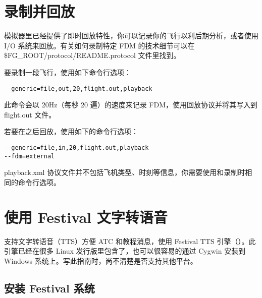 \section{录制并回放}

模拟器里已经提供了即时回放特性，你可以记录你的飞行以利后期分析，或者使用 I/O 系统来回放。有关如何录制特定 FDM 的技术细节可以在 \$FG\_ROOT/protocol/README.protocol 文件里找到。

要录制一段飞行，使用如下命令行选项：

\begin{verbatim}
--generic=file,out,20,flight.out,playback
\end{verbatim}

此命令会以 20Hz（每秒 20 遍）的速度来记录 FDM，使用回放协议并将其写入到 flight.out 文件。

若要在之后回放，使用如下的命令行选项：

\begin{verbatim}
--generic=file,in,20,flight.out,playback
--fdm=external
\end{verbatim}

playback.xml 协议文件并不包括飞机类型、时刻等信息，你需要使用和录制时相同的命令行选项。

\section{使用 Festival 文字转语音}

\FlightGear{} 支持文字转语音（TTS）方便 ATC 和教程消息，使用 Festival TTS 引擎（）。此引擎已经在很多 Linux 发行版里包含了，也可以很容易的通过 Cygwin 安装到 Windows 系统上。写此指南时，尚不清楚是否支持其他平台。

\subsection{安装 Festival 系统}

